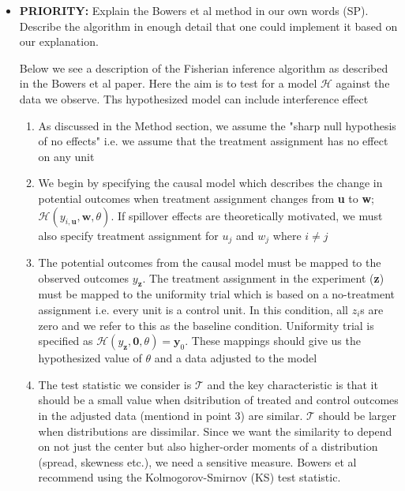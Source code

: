 \documentclass[12pt]{article}
\begin{document}
\begin{itemize}
\item {\bf PRIORITY:} Explain the Bowers et al method in our own words (SP). Describe the algorithm in enough detail that one could implement it based on our explanation.

Below we see a description of the Fisherian inference algorithm as described in the Bowers et al paper. Here the aim is to test for a model $\mathcal{H}$ against the data we observe. Ths hypothesized model can include interference effect

\begin{enumerate}

\item As discussed in the Method section, we assume the "sharp null hypothesis of no effects" i.e. we assume that the treatment assignment has no effect on any unit

\item We begin by specifying the causal model which describes the change in potential outcomes when treatment assignment changes from \textbf{u} to \textbf{w}; $\mathcal{H}(y_{i, \textbf{u}}, \textbf{w}, \theta)$. If spillover effects are theoretically motivated, we must also specify treatment assignment for $u_j$ and $w_j$ where $i \neq j$

\item The potential outcomes from the causal model must be mapped to the observed outcomes $y_\textbf{z}$. The treatment assignment in the experiment (\textbf{z}) must be mapped to the uniformity trial which is based on a no-treatment assignment i.e. every unit is a control unit. In this condition, all $z_{i}$s are zero and we refer to this as the baseline condition. Uniformity trial is specified as $\mathcal{H}(y_{\textbf{z}}, \textbf{0}, \theta) = \textbf{y}_0$. These mappings should give us the hypothesized value of $\theta$ and a data adjusted to the model

\item The test statistic we consider is $\mathcal{T}$ and the key characteristic is that it should be a small value when dsitribution of treated and control outcomes in the adjusted data (mentiond in point 3) are similar. $\mathcal{T}$ should be larger when distributions are dissimilar. Since we want the similarity to depend on not just the center but also higher-order moments of a distribution (spread, skewness etc.), we need a sensitive measure. Bowers et al recommend using the Kolmogorov-Smirnov (KS) test statistic.


\end{enumerate}
\end{itemize}
\end{document}
